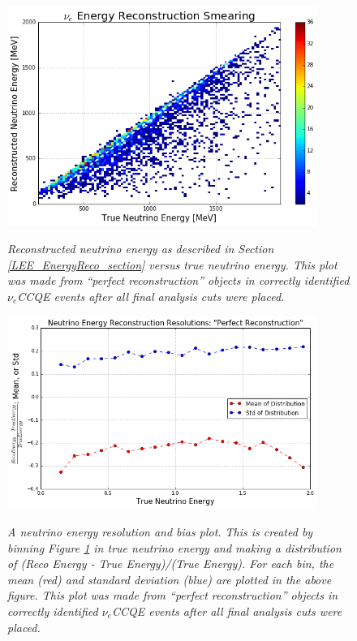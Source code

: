 \begin{figure}[ht!]
\centering
\includegraphics[width=0.9\textwidth]{Figures/LEE_EnergySmear_WithAnalysisCuts.png}\\%
\caption{\textit{Reconstructed neutrino energy as described in Section \ref{LEE_EnergyReco_section} versus true neutrino energy. This plot was made from ``perfect reconstruction'' objects in correctly identified $\nu_e$CCQE events after all final analysis cuts were placed.}}
\label{energy_smear_plot_fig}
\end{figure}

\begin{figure}[ht!]
\centering
\includegraphics[width=0.9\textwidth]{Figures/LEE_EnergyRes_WithAnalysisCuts.png}\\%
\caption{\textit{A neutrino energy resolution and bias plot. This is created by binning Figure \ref{energy_smear_plot_fig} in true neutrino energy and making a distribution of (Reco Energy - True Energy)/(True Energy). For each bin, the mean (red) and standard deviation (blue) are plotted in the above figure. This plot was made from ``perfect reconstruction'' objects in correctly identified $\nu_e$CCQE events after all final analysis cuts were placed.}}
\label{energy_res_plot_fig}
\end{figure}

